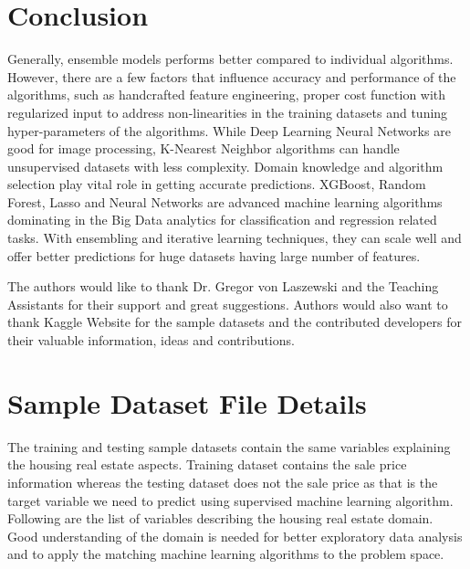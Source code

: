 \documentclass[sigconf]{acmart}
\begin{document}
   
	\section{Conclusion}
	
	Generally, ensemble models performs better compared to individual algorithms. However, there are a few factors that influence accuracy and performance of the algorithms, such as handcrafted feature engineering, proper cost function with regularized input to address non-linearities in the training datasets and tuning hyper-parameters of the algorithms. While Deep Learning Neural Networks are good for image processing, K-Nearest Neighbor algorithms can handle unsupervised datasets with less complexity. Domain knowledge and algorithm selection play vital role in getting accurate predictions. XGBoost, Random Forest, Lasso and Neural Networks are advanced machine learning algorithms dominating in the Big Data analytics for classification and regression related tasks. With ensembling and iterative learning techniques, they can scale well and offer better predictions for huge datasets having large number of features. 
		
	\appendix
		
	\nocite{*}
	
	\begin{acks}	
			The authors would like to thank Dr. Gregor von Laszewski and the Teaching Assistants for their support and great suggestions. Authors would also want to thank Kaggle Website for the sample datasets and the contributed developers for their valuable information, ideas and contributions.		
	\end{acks}


	
	 	

	\section{Sample Dataset File Details}
	The training and testing sample datasets contain the same variables explaining the housing real estate aspects. Training dataset contains the sale price information whereas the testing dataset does not the sale price as that is the target variable we need to predict using supervised machine learning algorithm. Following are the list of variables describing the housing real estate domain. Good understanding of the domain is needed for better exploratory data analysis and to apply the matching machine learning algorithms to the problem space.
	
\end{document}
